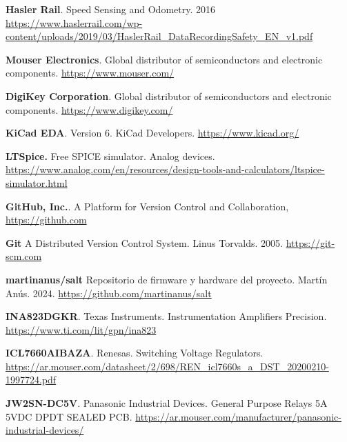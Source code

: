 \begin{thebibliography}{30}
\textbf{Hasler Rail}. Speed Sensing and Odometry. 2016
\href{https://www.haslerrail.com/wp-content/uploads/2019/03/HaslerRail_DataRecordingSafety_EN_v1.pdf}{https://www.haslerrail.com/wp-content/uploads/2019/03/HaslerRail\_DataRecordingSafety\_EN\_v1.pdf}

\textbf{Mouser Electronics}.  Global distributor of semiconductors and electronic components. \href{https://www.mouser.com/}{https://www.mouser.com/}

\textbf{DigiKey Corporation}. Global distributor of semiconductors and electronic components. \href{https://www.digikey.com/}{https://www.digikey.com/}


\textbf{KiCad EDA}. Version 6. KiCad Developers.
\href{https://www.kicad.org/}{https://www.kicad.org/}


\textbf{LTSpice.} Free SPICE simulator. Analog devices.
\href{https://www.analog.com/en/resources/design-tools-and-calculators/ltspice-simulator.html}{https://www.analog.com/en/resources/design-tools-and-calculators/ltspice-simulator.html}


\textbf{GitHub, Inc.}. A Platform for Version Control and Collaboration,
\href{https://github.com}{https://github.com}


\textbf{Git} A Distributed Version Control System. Linus Torvalds. 2005.
\href{https://git-scm.com}{https://git-scm.com}


\textbf{martinanus/salt} Repositorio de firmware y hardware del proyecto. Martín Anús. 2024. \href{https://github.com/martinanus/salt}{https://github.com/martinanus/salt}



\textbf{INA823DGKR}. Texas Instruments. Instrumentation Amplifiers Precision. 
\href{https://www.ti.com/lit/gpn/ina823}{https://www.ti.com/lit/gpn/ina823}


\textbf{ICL7660AIBAZA}. Renesas. Switching Voltage Regulators. 
\href{https://ar.mouser.com/datasheet/2/698/REN_icl7660s_a_DST_20200210-1997724.pdf}{https://ar.mouser.com/datasheet/2/698/REN\_icl7660s\_a\_DST\_20200210-1997724.pdf}

\textbf{JW2SN-DC5V}. Panasonic Industrial Devices. General Purpose Relays 5A 5VDC DPDT SEALED PCB. 
\href{https://ar.mouser.com/manufacturer/panasonic-industrial-devices/}{https://ar.mouser.com/manufacturer/panasonic-industrial-devices/}



\end{thebibliography}
